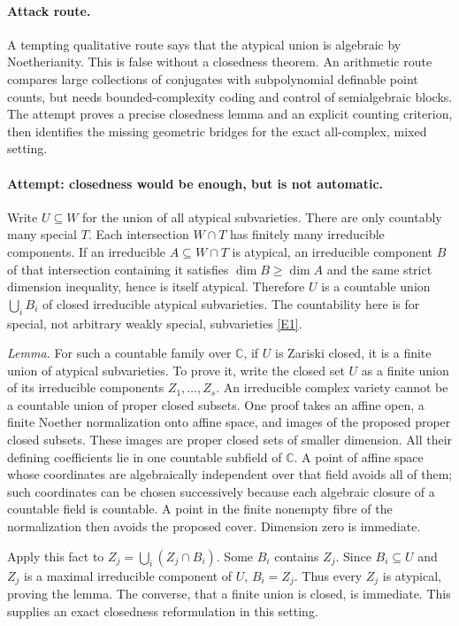\documentclass[11pt,a4paper]{article}
\numberwithin{equation}{section}
\newcommand{\C}{\mathbb{C}}
\newcommand{\eref}[2]{\hyperlink{extra:#1:#2}{[E#2]}}
\begin{document}
\paragraph{Attack route.}
A tempting qualitative route says that the atypical union is algebraic by
Noetherianity. This is false without a closedness theorem. An arithmetic
route compares large collections of conjugates with subpolynomial definable
point counts, but needs bounded-complexity coding and control of
semialgebraic blocks. The attempt proves a precise closedness lemma and
an explicit counting criterion, then identifies the missing geometric
bridges for the exact all-complex, mixed setting.

\paragraph{Attempt: closedness would be enough, but is not automatic.}
Write $U\subseteq W$ for the union of all atypical subvarieties.
There are only countably many special $T$. Each intersection $W\cap T$
has finitely many irreducible components. If an irreducible
$A\subseteq W\cap T$ is atypical, an irreducible component $B$ of that
intersection containing it satisfies $\dim B\geq\dim A$ and the same
strict dimension inequality, hence is itself atypical. Therefore $U$ is
a countable union $\bigcup_i B_i$ of closed irreducible atypical subvarieties.
The countability here is for special, not arbitrary weakly special,
subvarieties \eref{82}{1}.

\emph{Lemma.} For such a countable family over $\C$, if $U$ is Zariski
closed, it is a finite union of atypical subvarieties.
To prove it, write the closed set $U$ as a finite union of its irreducible
components $Z_1,\ldots,Z_s$. An irreducible complex variety cannot be a
countable union of proper closed subsets. One proof takes an affine open,
a finite Noether normalization onto affine space, and images of the proposed
proper closed subsets. These images are proper closed sets of smaller
dimension. All their defining coefficients lie in one countable subfield
of $\C$. A point of affine space whose coordinates are algebraically
independent over that field avoids all of them; such coordinates can be
chosen successively because each algebraic closure of a countable field
is countable. A point in the finite nonempty fibre of the normalization
then avoids the proposed cover. Dimension zero is immediate.

Apply this fact to
$Z_j=\bigcup_i(Z_j\cap B_i)$. Some $B_i$ contains $Z_j$. Since
$B_i\subseteq U$ and $Z_j$ is a maximal irreducible component of $U$,
$B_i=Z_j$. Thus every $Z_j$ is atypical, proving the lemma. The converse,
that a finite union is closed, is immediate. This supplies an exact
closedness reformulation in this setting.
\end{document}
